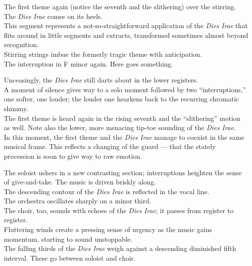 \documentclass{beamer}
\begin{document}
\begin{frame} 
  The first theme again (notice the seventh and the slithering) over the stirring. 
  \pause \\
  The \textit{Dies Irae} comes on its heels. 
  \pause \\ 
  This segment represents a not-so-straightforward application of the \textit{Dies Irae} that flits around in little segments and extracts, transformed sometimes almost beyond recognition. 
  \pause \\ 
  Stirring strings imbue the formerly tragic theme with anticipation. 
  \pause \\ 
  The interruption in F minor again. Here goes something. 
\end{frame}
  
\begin{frame} 
  Unceasingly, the \textit{Dies Irae} still darts about in the lower registers. 
  \pause \\ 
  A moment of silence gives way to a solo moment followed by two ``interruptions,'' one softer, one louder; the louder one hearkens back to the recurring chromatic shimmy. 
  \pause \\ 
  The first theme is heard again in the rising seventh and the ``slithering'' motion as well. Note also the lower, more menacing tip-toe sounding of the \textit{Dies Irae}. 
  \pause \\ 
  In this moment, the first theme and the \textit{Dies Irae} manage to coexist in the same musical frame. This reflects a changing of the guard --- that the stately procession is soon to give way to raw emotion. 
\end{frame} 

\begin{frame}
  The soloist ushers in a new contrasting section; interruptions heighten the sense of give-and-take. The music is driven briskly along. 
  \pause \\ 
  The descending contour of the \textit{Dies Irae} is reflected in the vocal line. 
  \pause \\
  The orchestra oscillates sharply on a minor third. 
  \pause \\ 
  The choir, too, sounds with echoes of the \textit{Dies Irae}; it passes from register to register. 
  \pause \\
  Fluttering winds create a pressing sense of urgency as the music gains momentum, starting to sound unstoppable. 
  \pause \\ 
  The falling thirds of the \textit{Dies Irae} weigh against a descending diminished fifth interval. These go between soloist and choir. 
\end{frame} 
\end{document}
